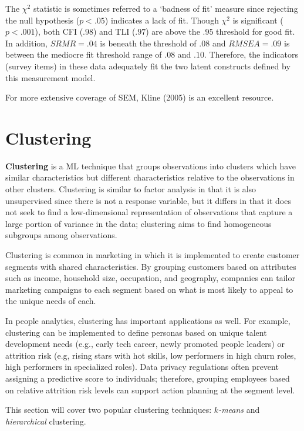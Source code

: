 \documentclass[
]{book}
\begin{document}
The \(\chi^2\) statistic is sometimes referred to a `badness of fit' measure since rejecting the null hypothesis (\(p < .05\)) indicates a lack of fit. Though \(\chi^2\) is significant (\(p < .001\)), both CFI (\(.98\)) and TLI (\(.97\)) are above the \(.95\) threshold for good fit. In addition, \(SRMR = .04\) is beneath the threshold of \(.08\) and \(RMSEA = .09\) is between the mediocre fit threshold range of \(.08\) and \(.10\). Therefore, the indicators (survey items) in these data adequately fit the two latent constructs defined by this measurement model.

For more extensive coverage of SEM, Kline (2005) is an excellent resource.

\hypertarget{clustering}{%
\section{Clustering}\label{clustering}}

\textbf{Clustering} is a ML technique that groups observations into clusters which have similar characteristics but different characteristics relative to the observations in other clusters. Clustering is similar to factor analysis in that it is also unsupervised since there is not a response variable, but it differs in that it does not seek to find a low-dimensional representation of observations that capture a large portion of variance in the data; clustering aims to find homogeneous subgroups among observations.

Clustering is common in marketing in which it is implemented to create customer segments with shared characteristics. By grouping customers based on attributes such as income, household size, occupation, and geography, companies can tailor marketing campaigns to each segment based on what is most likely to appeal to the unique needs of each.

In people analytics, clustering has important applications as well. For example, clustering can be implemented to define personas based on unique talent development needs (e.g., early tech career, newly promoted people leaders) or attrition risk (e.g, rising stars with hot skills, low performers in high churn roles, high performers in specialized roles). Data privacy regulations often prevent assigning a predictive score to individuals; therefore, grouping employees based on relative attrition risk levels can support action planning at the segment level.

This section will cover two popular clustering techniques: \(k\)\emph{-means} and \emph{hierarchical} clustering.
\end{document}
